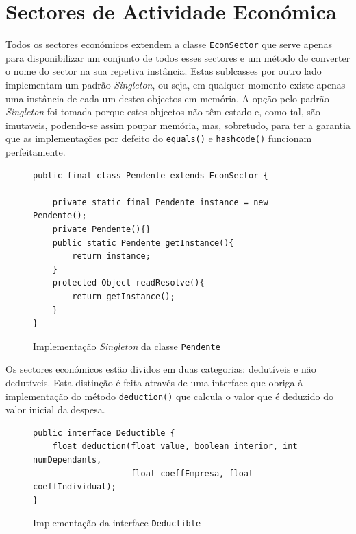 \documentclass[12pt,a4paper]{report}
\begin{document}
\pagebreak

    \section{Sectores de Actividade Económica}
    \label{sec:econsector}
    Todos os sectores económicos extendem a classe \texttt{EconSector}
    que serve apenas para disponibilizar um conjunto de todos esses sectores e um
    método de converter o nome do sector na sua repetiva instância.
    Estas sublcasses por outro lado implementam um padrão \textit{Singleton}, ou
    seja, em qualquer momento existe apenas uma instância de cada um destes
    objectos em memória. A opção pelo padrão \textit{Singleton} foi tomada porque
    estes objectos não têm estado e, como tal, são imutaveis, podendo-se assim
    poupar memória, mas, sobretudo, para ter a garantia que as implementações por
    defeito do \texttt{equals()} e \texttt{hashcode()}
    funcionam perfeitamente.
    \begin{figure}[h]
        \begin{verbatim}
public final class Pendente extends EconSector {

    private static final Pendente instance = new Pendente();
    private Pendente(){}
    public static Pendente getInstance(){
        return instance;
    }
    protected Object readResolve(){
        return getInstance();
    }
}
        \end{verbatim}
        \caption{Implementação \textit{Singleton} da classe
                \texttt{Pendente}}
        \label{fig:singleton}
    \end{figure}

    Os sectores económicos estão dividos em duas categorias: dedutíveis
    e não dedutíveis. Esta distinção é feita através de uma interface que
    obriga à implementação do método \texttt{deduction()} que calcula
    o valor que é deduzido do valor inicial da despesa.
    \begin{figure}[h]
        \begin{verbatim}
public interface Deductible {
    float deduction(float value, boolean interior, int numDependants,
                    float coeffEmpresa, float coeffIndividual);
}
        \end{verbatim}
        \caption{Implementação da interface \texttt{Deductible}}
        \label{fig:deductible}
    \end{figure}
\end{document}
